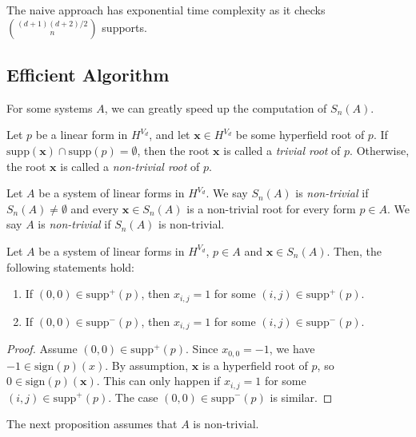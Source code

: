 The naive approach has exponential time complexity as it checks \( \binom{(d+1)(d+2)/2}{n} \) supports.

\subsection*{Efficient Algorithm}

For some systems \( A \), we can greatly speed up the computation of $S_{n}(A)$.


\begin{definition}
    Let $p$ be a linear form in \( H^{V_d} \), and let $\mathbf{x} \in {H}^{V_d}$ be some hyperfield root of $p$. If $\mathrm{supp}(\mathbf{x}) \cap \mathrm{supp}(p) = \emptyset$, then the root $\mathbf{x}$ is called a \emph{trivial root} of $p$. Otherwise, the root $\mathbf{x}$ is called a \emph{non-trivial root} of $p$.
\end{definition}

\begin{definition}
    Let $A$ be a system of linear forms in \( H^{V_d} \). We say $S_{n}(A)$ is \emph{non-trivial} if $S_{n}(A) \neq \emptyset$ and every $\mathbf{x} \in S_{n}(A)$ is a non-trivial root for every form $p \in A$. We say $A$ is \emph{non-trivial} if $S_{n}(A)$ is non-trivial.
\end{definition}
  
\begin{proposition}
Let $A$ be a system of linear forms in \( H^{V_d} \), $p \in A$ and $\mathbf{x} \in S_{n}(A)$. Then, the following statements hold:
\begin{enumerate}
    \item If $(0,0) \in \mathrm{supp}^+(p)$, then $x_{i,j} = 1$ for some $(i,j) \in \mathrm{supp}^+(p)$. 
    \item If $(0,0) \in \mathrm{supp}^-(p)$, then $x_{i,j} = 1$ for some $(i,j) \in \mathrm{supp}^-(p)$. 
\end{enumerate}
\end{proposition}


\begin{proof}
Assume $(0,0) \in \mathrm{supp}^+(p)$. Since $x_{0,0} = -1$, we have $-1 \in \mathrm{sign}(p)(x)$. By assumption, $\mathbf{x}$ is a hyperfield root of $p$, so $0 \in \mathrm{sign}(p)(\mathbf{x})$. This can only happen if $x_{i,j} = 1$ for some $(i,j) \in \mathrm{supp}^+(p)$. The case $(0,0) \in \mathrm{supp}^-(p)$ is similar.
\end{proof}

The next proposition assumes that $A$ is non-trivial. 

